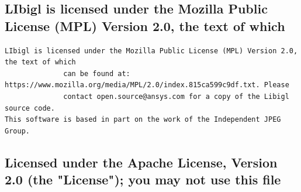 \subsection{LIbigl is licensed under the Mozilla Public License (MPL) Version 2.0, the text of which}

\begin{lstlisting}[basicstyle=\ttfamily\scriptsize,breaklines=true]
LIbigl is licensed under the Mozilla Public License (MPL) Version 2.0, the text of which
              can be found at: https://www.mozilla.org/media/MPL/2.0/index.815ca599c9df.txt. Please
              contact open.source@ansys.com for a copy of the Libigl source code.
This software is based in part on the work of the Independent JPEG Group.
\end{lstlisting}

\subsection{Licensed under the Apache License, Version 2.0 (the "License"); you may not use this file}

